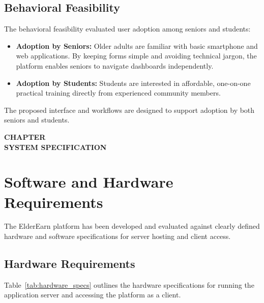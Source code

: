 \documentclass[12pt,a4paper]{report}
\newcommand{\chaptertitlepage}[1]{%
  \clearpage
  \thispagestyle{empty}
  \null
  \vfill
  \begin{center}
    {\fontsize{16pt}{18pt}\selectfont\bfseries CHAPTER \thechapter}\\[0.5cm]
    {\fontsize{16pt}{18pt}\selectfont\bfseries #1}
  \end{center}
  \vfill
  \null
  \clearpage
  \setcounter{section}{0}
}
\begin{document}
\subsection{Behavioral Feasibility}
The behavioral feasibility evaluated user adoption among seniors and students:
\begin{itemize}[leftmargin=1.5em, itemsep=2pt]
  \item \textbf{Adoption by Seniors:} Older adults are familiar with basic smartphone and web applications. By keeping forms simple and avoiding technical jargon, the platform enables seniors to navigate dashboards independently.
  \item \textbf{Adoption by Students:} Students are interested in affordable, one-on-one practical training directly from experienced community members.
\end{itemize}
The proposed interface and workflows are designed to support adoption by both seniors and students.

\chaptertitlepage{SYSTEM SPECIFICATION}

\section{Software and Hardware Requirements}
The ElderEarn platform has been developed and evaluated against clearly defined hardware and software specifications for server hosting and client access.

\subsection{Hardware Requirements}
Table~\ref{tab:hardware_specs} outlines the hardware specifications for running the application server and accessing the platform as a client.
\end{document}
